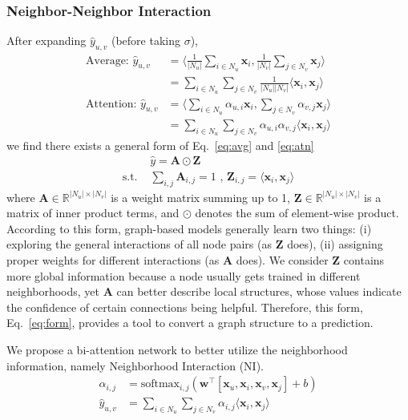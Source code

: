\documentclass[sigconf]{acmart}
\newcommand{\bbR}{\mathbb{R}}
\newcommand{\bw}{\mathbf{w}}
\newcommand{\bx}{\mathbf{x}}
\newcommand{\new}[1]{{\color{black} #1}}
\begin{document}
\subsubsection{Neighbor-Neighbor Interaction} After expanding $\hat{y}_{u,v}$ (before taking $\sigma$), 
\begin{align}
\text{Average: } \hat{y}_{u,v} & = \langle \frac{1}{|N_u|} \sum_{i \in N_u} \bx_i, \frac{1}{|N_v|} \sum_{j \in N_v} \bx_j \rangle \\ 
& = \sum_{i \in N_u} \sum_{j \in N_v} \frac{1}{|N_u| |N_v|} \langle \bx_i, \bx_j \rangle \label{eq:avg}\\
\text{Attention: } \hat{y}_{u,v} & = \langle \sum_{i \in N_u} \alpha_{u,i} \bx_i, \sum_{j \in N_v} \alpha_{v,j} \bx_j \rangle \\
& = \sum_{i \in N_u} \sum_{j \in N_v} \alpha_{u,i} \alpha_{v,j} \langle \bx_i, \bx_j \rangle \label{eq:atn}
\end{align}
we find there exists a general form of Eq.~\eqref{eq:avg} and \eqref{eq:atn}
\begin{align}
& \hat{y} = \mathbf{A} \odot \mathbf{Z} \label{eq:form} \\
\text{s.t. } & \sum_{i,j} \mathbf{A}_{i,j} = 1 \text{ , } \mathbf{Z}_{i,j} = \langle \bx_i, \bx_j \rangle
\end{align}
where $\mathbf{A} \in \bbR^{|N_u| \times |N_v|}$ is a weight matrix summing up to 1, $\mathbf{Z} \in \bbR^{|N_u| \times |N_v|}$ is a matrix of inner product terms, and $\odot$ denotes the sum of element-wise product. According to this form, graph-based models generally learn two things: (i) exploring the general interactions of all node pairs (as $\mathbf{Z}$ does), (ii) assigning proper weights for different interactions (as $\mathbf{A}$ does). \new{We consider $\mathbf{Z}$ contains more global information because a node usually gets trained in different neighborhoods, yet $\mathbf{A}$ can better describe local structures, whose values indicate the confidence of certain connections being helpful. Therefore, this form, Eq.~\eqref{eq:form}, provides a tool to convert a graph structure to a prediction.}

We propose a bi-attention network to better utilize the neighborhood information, namely Neighborhood Interaction (NI).
\begin{align}
\alpha_{i,j} & = \text{softmax}_{i,j}(\bw^\top [\bx_u, \bx_i, \bx_v, \bx_j] + b) \label{eq:ni_atn}\\
\hat{y}_{u,v} & = \sum_{i \in N_u} \sum_{j \in N_v} \alpha_{i,j} \langle \bx_i, \bx_j \rangle \label{eq:ni}
\end{align}
\end{document}
